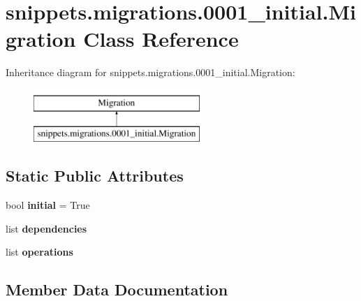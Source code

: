 \hypertarget{classsnippets_1_1migrations_1_10001__initial_1_1_migration}{}\section{snippets.\+migrations.0001\+\_\+initial.Migration Class Reference}
\label{classsnippets_1_1migrations_1_10001__initial_1_1_migration}
Inheritance diagram for snippets.\+migrations.0001\+\_\+initial.Migration\+:\begin{figure}[H]
\begin{center}
\leavevmode
\includegraphics[height=2.000000cm]{classsnippets_1_1migrations_1_10001__initial_1_1_migration}
\end{center}
\end{figure}
\subsection*{Static Public Attributes}
\begin{DoxyCompactItemize}
\item 
\mbox{\label{classsnippets_1_1migrations_1_10001__initial_1_1_migration_a15710109783bc33a9894518160304f10}} 
bool {\bfseries initial} = True
\item 
list {\bfseries dependencies}
\item 
list {\bfseries operations}
\end{DoxyCompactItemize}


\subsection{Member Data Documentation}
\mbox{\label{classsnippets_1_1migrations_1_10001__initial_1_1_migration_a8dcd961f450c0f66f326ce9daef450f5}} 
